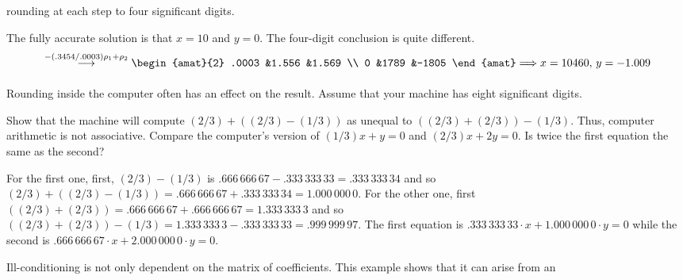 \begin{exercises}
\begin{exparts*}
         rounding at each step to four significant digits. 
    \end{exparts*}
    \begin{answer}
      \begin{exparts}
        \partsitem The fully accurate solution is that $x=10$ and $y=0$.
        \partsitem The four-digit conclusion is quite different.
          \begin{equation*}
            \grstep{-(.3454/.0003)\rho_1+\rho_2}
            \begin{amat}{2}
              .0003  &1.556  &1.569  \\
              0      &1789   &-1805
            \end{amat}
            \Longrightarrow
            x=10460,\,y=-1.009
          \end{equation*}
      \end{exparts}
    \end{answer}
  \item 
    Rounding inside the computer often has an effect on the result.
    Assume that your machine has eight significant digits.
    \begin{exparts}
      \partsitem Show that the machine will compute 
         $(2/3)+((2/3)-(1/3))$ as unequal to $((2/3)+(2/3))-(1/3)$.
         Thus, computer arithmetic is not associative.
      \partsitem Compare the computer's version of $(1/3)x+y=0$
        and $(2/3)x+2y=0$.
        Is twice the first equation the same as the second?
    \end{exparts}
    \begin{answer}
      \begin{exparts}
        \partsitem For the first one, first, $(2/3)-(1/3)$ is 
          $.666\,666\,67-.333\,333\,33=.333\,333\,34$
          and so 
          $(2/3)+((2/3)-(1/3))=.666\,666\,67+.333\,333\,34=1.000\,000\,0$.
          For the other one, first 
          $((2/3)+(2/3))=.666\,666\,67+.666\,666\,67=1.333\,333\,3$
          and so 
          $((2/3)+(2/3))-(1/3)=1.333\,333\,3-.333\,333\,33=.999\,999\,97$.
        \partsitem The first equation is 
          $.333\,333\,33\cdot x+1.000\,000\,0\cdot y=0$
          while the second is 
          $.666\,666\,67\cdot x+2.000\,000\,0\cdot y=0$.
      \end{exparts}
    \end{answer}
  \item 
    Ill-conditioning is not only dependent on the matrix of
    coefficients.
    This example \cite{Hamming} shows that it can arise from an

\end{exercises}
